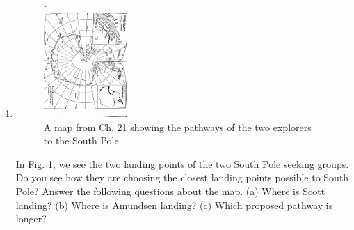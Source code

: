 \documentclass{article}
\begin{document}
\begin{enumerate}
\item
\begin{figure}[hb]
\centering
\includegraphics[width=0.3\textwidth,angle=90,trim=1cm 1cm 1cm 1cm,clip=true]{Map.jpg}
\caption{\label{fig:Map} A map from Ch. 21 showing the pathways of the two explorers to the South Pole.}
\end{figure}
In Fig. \ref{fig:Map}, we see the two landing points of the two South Pole seeking groups.  Do you see how they are choosing the closest landing points possible to South Pole?  Answer the following questions about the map.  (a) Where is Scott landing?  (b) Where is Amundsen landing?  (c) Which proposed pathway is longer? \\ \vspace{2cm}
\end{enumerate}
\end{document}
